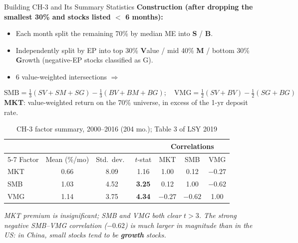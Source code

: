 \documentclass{beamer}
\begin{document}
\begin{frame}{Building CH-3 and Its Summary Statistics}
	\small
	\textbf{Construction (after dropping the smallest 30\% and stocks listed $<$ 6 months):}
	\begin{itemize}\setlength\itemsep{1pt}
		\item Each month split the remaining 70\% by median ME into \textbf{S} / \textbf{B}.
		\item Independently split by EP into top 30\% \textbf{V}alue / mid 40\% \textbf{M} / bottom 30\% \textbf{G}rowth (negative-EP stocks classified as G).
		\item 6 value-weighted intersections $\Rightarrow$
	\end{itemize}
	$$\text{SMB} = \tfrac{1}{3}(SV+SM+SG) - \tfrac{1}{3}(BV+BM+BG); \quad \text{VMG} = \tfrac{1}{2}(SV+BV) - \tfrac{1}{2}(SG+BG)$$
	\textbf{MKT}: value-weighted return on the 70\% universe, in excess of the 1-yr deposit rate.
	\vspace{2pt}
	\begin{table}
		\centering
		\footnotesize
		\caption{CH-3 factor summary, 2000--2016 (204 mo.); Table 3 of LSY 2019}
		\begin{tabular}{lcccccc}
			\hline & & & & \multicolumn{3}{c}{Correlations} \\
			\cline{5-7} Factor & Mean (\%/mo) & Std.\ dev.\ & $t$-stat & MKT & SMB & VMG \\
			\hline
			MKT & 0.66 & 8.09 & 1.16 & 1.00 & 0.12 & $-0.27$ \\
			SMB & 1.03 & 4.52 & \textbf{3.25} & 0.12 & 1.00 & $-0.62$ \\
			VMG & 1.14 & 3.75 & \textbf{4.34} & $-0.27$ & $-0.62$ & 1.00 \\
			\hline
		\end{tabular}
	\end{table}
	\footnotesize
	\textit{MKT premium is insignificant; SMB and VMG both clear $t > 3$. The strong negative SMB--VMG correlation ($-0.62$) is much larger in magnitude than in the US: in China, small stocks tend to be \textbf{growth} stocks.}
\end{frame}
\end{document}
